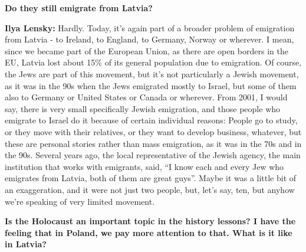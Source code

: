 \textbf{Do they still emigrate from Latvia?} 

\textbf{Ilya Lensky:} Hardly. Today, it’s again part of a broader problem of emigration from Latvia - to Ireland, to England, to Germany, Norway or wherever. I mean, since we became part of the European Union, as there are open borders in the EU, Latvia lost about 15\% of its general population due to emigration. Of course, the Jews are part of this movement, but it’s not particularly a Jewish movement, as it was in the 90s when the Jews emigrated mostly to Israel, but some of them also to Germany or United States or Canada or wherever. From 2001, I would say, there is very small specifically Jewish emigration, and those people who emigrate to Israel do it because of certain individual reasons: People go to study, or they move with their relatives, or they want to develop business, whatever, but these are personal stories rather than mass emigration, as it was in the 70s and in the 90s. Several years ago, the local representative of the Jewish agency, the main institution that works with emigrants, said, ``I know each and every Jew who emigrates from Latvia, both of them are great guys''. Maybe it was a little bit of an exaggeration, and it were not just two people, but, let’s say, ten, but anyhow we’re speaking of very limited movement. 

\textbf{Is the Holocaust an important topic in the history lessons? I have the feeling that in Poland, we pay more attention to that. What is it like in Latvia?} 

